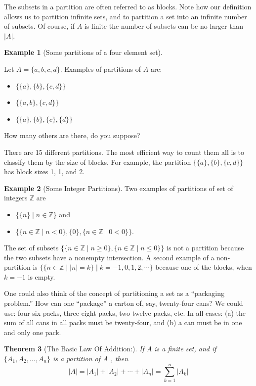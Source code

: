 \documentclass[10pt,]{book}
\theoremstyle{plain}
\newtheorem{theorem}{Theorem}[section]
\theoremstyle{definition}
\theoremstyle{definition}
\newtheorem{example}[theorem]{Example}
\theoremstyle{definition}
\begin{document}
 The subsets in a partition are often referred to as blocks. Note how our definition allows us to partition infinite sets, and to partition a set into an infinite number of subsets. Of course, if \(A\)  is finite the number of subsets can be no larger than \(\lvert A \rvert \).
%
\begin{example}[Some partitions of a four element set]\label{some-partitions-4}

  Let \(A = \{a, b, c, d\}\). Examples of partitions of \(A\)  are:%
\par
\leavevmode%
\begin{itemize}[label=\textbullet]
\item{} \(\{\{a\}, \{b\}, \{c, d\}\}\)%
\item{} \(\{\{a, b\}, \{c, d\}\}\)%
\item{} \(\{\{a\}, \{b\}, \{c\}, \{d\}\}\)%
\end{itemize}
%
\par
How many others are there, do you suppose?
%
\par
There are 15 different partitions.  The most efficient way to count them all is to classify them by the size of blocks.   For example, the partition \(\{\{a\}, \{b\}, \{c, d\}\}\) has block sizes 1, 1, and 2.
%
\end{example}
\begin{example}[Some Integer Partitions]\label{some-integer-partitions}
Two examples of partitions of set of integers \(\mathbb{Z}\) are %
\par
\leavevmode%
\begin{itemize}[label=\textbullet]
\item{}\(\{\{n\} \mid n \in \mathbb{Z}\}\) and%
\item{} \(\{\{ n \in \mathbb{Z} \mid n < 0\}, \{0\},\{ n \in \mathbb{Z} \mid 0 < 0 \}\}\).%
\end{itemize}
%
\par
 The set of subsets \(\{\{n \in \mathbb{Z} \mid n \geq 0\},\{n \in \mathbb{Z} \mid  n \leq 0\}\}\) is not a partition because the two subsets have a nonempty intersection. A second example of a non-partition is 
\(\{\{n \in \mathbb{Z} \mid  \lvert n \rvert = k\} \mid k = -1, 0, 1, 2, \cdots\}\) because one of the blocks, when \(k=-1\) is empty.%
\end{example}
\par
One could also think of the concept of partitioning a set as a ``packaging problem.'' How can one ``package'' a carton of, say, twenty-four cans? We could use: four six-packs, three eight-packs, two twelve-packs, etc. In all cases: (a) the sum of all cans in all packs must be twenty-four, and (b) a can must be in one and only one pack.
%
\begin{theorem}[The Basic Law Of Addition:]\label{basic-law-addition}
If \(A\) is a finite set, and if \(\{A_1,A_2,\ldots ,A_n\}\) is a partition of \(A\) , then 
\begin{equation*}\lvert A \rvert = \lvert A_1 \rvert + \lvert A_2 \rvert + \cdots + \lvert A_n \rvert = \sum_{k=1}^n  \lvert A_k \rvert\end{equation*}
%
\end{theorem}
\par
\end{document}
